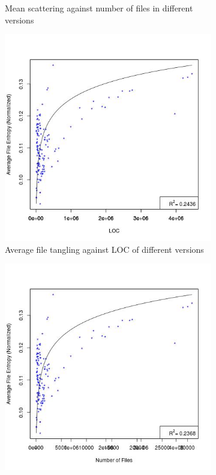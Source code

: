\documentclass[12pt]{article}
\begin{document}
\begin{figure}
\begin{subfigure}[b]{0.5\textwidth}
                \caption{Mean scattering against number of files in different versions}
                \label{overall-scatter2}
        \end{subfigure}
        \begin{subfigure}[b]{0.5\textwidth}
                \centering
                \includegraphics[width=\textwidth]{average-tangling-vs-loc-overall-fitted.jpg}
                \caption{Average file tangling against LOC of different versions}
                \label{overall-tangle1}
        \end{subfigure}%
        \begin{subfigure}[b]{0.5\textwidth}
                \centering
                \includegraphics[width=\textwidth]{average-tangling-vs-num-files-overall-fitted.jpg}

\end{subfigure}
\end{figure}
\end{document}
